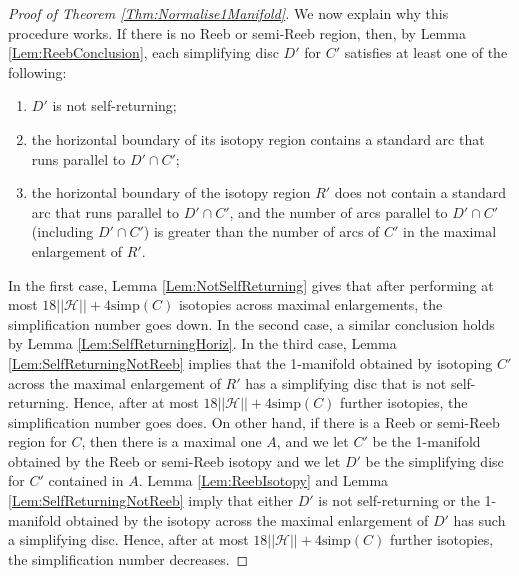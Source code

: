 \documentclass[oneside]{amsart}
\numberwithin{equation}{section}
\theoremstyle{plain}
\theoremstyle{definition}
\newcommand{\calH}{\mathcal{H}}
\begin{document}
\begin{proof}[Proof of Theorem \ref{Thm:Normalise1Manifold}]
We now explain why this procedure works. If there is no Reeb or semi-Reeb region, then, by Lemma \ref{Lem:ReebConclusion}, each simplifying disc $D'$ for $C'$ satisfies at least one of the following: 
\begin{enumerate}
\item $D'$ is not self-returning;
\item the horizontal boundary of its isotopy region contains a standard arc that runs parallel to $D' \cap C'$;
\item the horizontal boundary of the isotopy region $R'$ does not contain a standard arc that runs parallel to $D' \cap C'$, and the number of arcs parallel to $D' \cap C'$ (including $D' \cap C'$) is greater than the number of arcs of $C'$ in the maximal enlargement of $R'$.
\end{enumerate}
In the first case, Lemma \ref{Lem:NotSelfReturning} gives that after performing at most $18||\calH|| + 4\mathrm{simp}(C)$ isotopies across maximal enlargements, the simplification number goes down. In the second case, a similar conclusion holds by Lemma \ref{Lem:SelfReturningHoriz}. In the third case, Lemma \ref{Lem:SelfReturningNotReeb} implies that the 1-manifold obtained by isotoping $C'$ across the maximal enlargement of $R'$ has a simplifying disc that is not self-returning. Hence, after at most $18||\calH|| + 4\mathrm{simp}(C)$ further isotopies, the simplification number goes does.
On other hand, if there is a Reeb or semi-Reeb region for $C$, then there is a maximal one $A$, and we let $C'$ be the 1-manifold obtained by the Reeb or semi-Reeb isotopy and we let $D'$ be the simplifying disc for $C'$ contained in $A$. Lemma \ref{Lem:ReebIsotopy} and Lemma \ref{Lem:SelfReturningNotReeb} imply that either $D'$ is not self-returning or the 1-manifold obtained by the isotopy across the maximal enlargement of $D'$ has such a simplifying disc. Hence, after at most $18||\calH|| + 4\mathrm{simp}(C)$ further isotopies, the simplification number decreases.


\end{proof}
\end{document}
